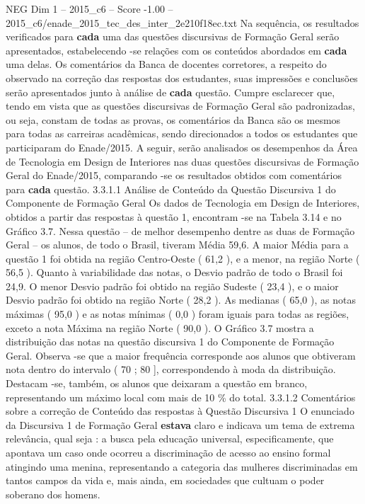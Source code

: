 \begin{textsample}{NEG Dim 1 – 2015\_c6 – Score -1.00 – 2015\_c6/enade\_2015\_tec\_des\_inter\_2e210f18ec.txt}
Na sequência, os resultados verificados para \textbf{cada} uma das questões discursivas de Formação Geral serão apresentados, estabelecendo -se relações com os conteúdos abordados em \textbf{cada} uma delas.
Os comentários da Banca de docentes corretores, a respeito do observado na correção das respostas dos estudantes, suas impressões e conclusões serão apresentados junto à análise de \textbf{cada} questão.
Cumpre esclarecer que, tendo em vista que as questões discursivas de Formação Geral são padronizadas, ou seja, constam de todas as provas, os comentários da Banca são os mesmos para todas as carreiras acadêmicas, sendo direcionados a todos os estudantes que participaram do Enade/2015.
A seguir, serão analisados os desempenhos da Área de Tecnologia em Design de Interiores nas duas questões discursivas de Formação Geral do Enade/2015, comparando -se os resultados obtidos com comentários para \textbf{cada} questão. 3.3.1.1 Análise de Conteúdo da Questão Discursiva 1 do Componente de Formação Geral Os dados de Tecnologia em Design de Interiores, obtidos a partir das respostas à questão 1, encontram -se na Tabela 3.14 e no Gráfico 3.7.
Nessa questão – de melhor desempenho dentre as duas de Formação Geral – os alunos, de todo o Brasil, tiveram Média 59,6.
A maior Média para a questão 1 foi obtida na região Centro-Oeste ( 61,2 ), e a menor, na região Norte ( 56,5 ).
Quanto à variabilidade das notas, o Desvio padrão de todo o Brasil foi 24,9.
O menor Desvio padrão foi obtido na região Sudeste ( 23,4 ), e o maior Desvio padrão foi obtido na região Norte ( 28,2 ).
As medianas ( 65,0 ), as notas máximas ( 95,0 ) e as notas mínimas ( 0,0 ) foram iguais para todas as regiões, exceto a nota Máxima na região Norte ( 90,0 ).
O Gráfico 3.7 mostra a distribuição das notas na questão discursiva 1 do Componente de Formação Geral.
Observa -se que a maior frequência corresponde aos alunos que obtiveram nota dentro do intervalo ( 70 ; 80 ], correspondendo à moda da distribuição.
Destacam -se, também, os alunos que deixaram a questão em branco, representando um máximo local com mais de 10 \% do total. 3.3.1.2 Comentários sobre a correção de Conteúdo das respostas à Questão Discursiva 1 O enunciado da Discursiva 1 de Formação Geral \textbf{estava} claro e indicava um tema de extrema relevância, qual seja : a busca pela educação universal, especificamente, que apontava um caso onde ocorreu a discriminação de acesso ao ensino formal atingindo uma menina, representando a categoria das mulheres discriminadas em tantos campos da vida e, mais ainda, em sociedades que cultuam o poder soberano dos homens.

\end{textsample}
